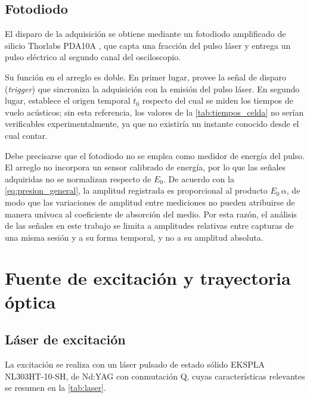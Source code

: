 \subsection*{Fotodiodo}

El disparo de la adquisición se obtiene mediante un fotodiodo
amplificado de silicio Thorlabs PDA10A \cite{Rangel2023}, que capta
una fracción del pulso láser y entrega un pulso eléctrico al segundo
canal del osciloscopio.

Su función en el arreglo es doble. En primer lugar, provee la señal
de disparo (\textit{trigger}) que sincroniza la adquisición con la
emisión del pulso láser. En segundo lugar, establece el origen
temporal $t_0$ respecto del cual se miden los tiempos de vuelo
acústicos; sin esta referencia, los valores de la
\cref{tab:tiempos_celda} no serían verificables experimentalmente,
ya que no existiría un instante conocido desde el cual contar.

Debe precisarse que el fotodiodo no se emplea como medidor de energía
del pulso. El arreglo no incorpora un sensor calibrado de energía,
por lo que las señales adquiridas no se normalizan respecto de $E_0$.
De acuerdo con la \cref{eq:presion_general}, la amplitud registrada
es proporcional al producto $E_0\,\alpha$, de modo que las
variaciones de amplitud entre mediciones no pueden atribuirse de
manera unívoca al coeficiente de absorción del medio. Por esta razón,
el análisis de las señales en este trabajo se limita a amplitudes
relativas entre capturas de una misma sesión y a su forma temporal, y
no a su amplitud absoluta.

\section{Fuente de excitación y trayectoria óptica}
\label{sec:excitacion}

\subsection*{Láser de excitación}

La excitación se realiza con un láser pulsado de estado sólido
EKSPLA NL303HT-10-SH, de Nd:YAG con conmutación Q, cuyas
características relevantes se resumen en la \cref{tab:laser}.

